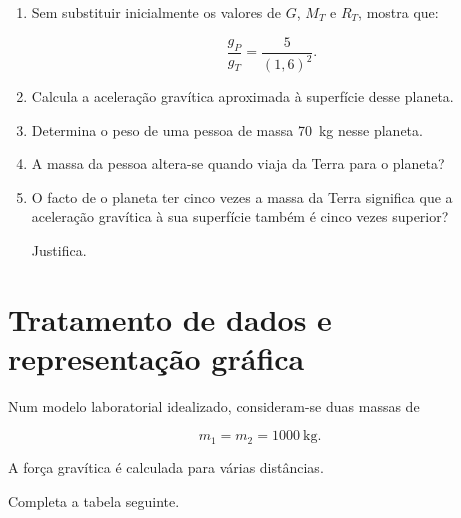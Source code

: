 \documentclass[11pt,a4paper]{article}
\newcommand{\resposta}[1][1]{
	\vspace{#1cm}
}
\begin{document}
	\begin{enumerate}[label=\textbf{\arabic*.},resume]
		
		\item Sem substituir inicialmente os valores de $G$, $M_T$ e $R_T$,
		mostra que:
		
		\[
		\frac{g_P}{g_T}
		=
		\frac{5}{(1{,}6)^2}.
		\]
		
		\resposta[1.1]
		
		\item Calcula a aceleração gravítica aproximada à superfície desse planeta.
		
		\resposta[1.0]
		
		\item Determina o peso de uma pessoa de massa \SI{70}{\kilogram}
		nesse planeta.
		
		\resposta[0.9]
		
		\item A massa da pessoa altera-se quando viaja da Terra para o planeta?
		
		\resposta[0.7]
		
		\item O facto de o planeta ter cinco vezes a massa da Terra significa que
		a aceleração gravítica à sua superfície também é cinco vezes superior?
		
		Justifica.
		
		\resposta[1.0]
		
	\end{enumerate}
	
	\section{Tratamento de dados e representação gráfica}
	
	Num modelo laboratorial idealizado, consideram-se duas massas de
	
	\[
	m_1=m_2=\SI{1000}{\kilogram}.
	\]
	
	A força gravítica é calculada para várias distâncias.
	
	Completa a tabela seguinte.
	
\end{document}
